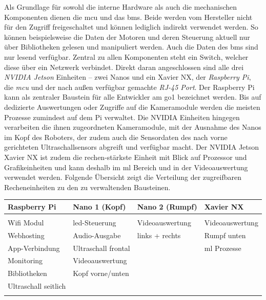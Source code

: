 Als Grundlage für sowohl die interne Hardware als auch die mechanischen Komponenten dienen die \gls{mcu} und das \gls{bms}.
Beide werden vom Hersteller nicht für den Zugriff freigeschaltet und können lediglich indirekt verwendet werden.
So können beispielsweise die Daten der Motoren und deren Steuerung aktuell nur über Bibliotheken gelesen und manipuliert werden.
Auch die Daten des \gls{bms} sind nur lesend verfügbar.
Zentral zu allen Komponenten steht ein Switch, welcher diese über ein Netzwerk verbindet.
Direkt daran angeschlossen sind alle drei \emph{NVIDIA Jetson} Einheiten -- zwei Nanos und ein Xavier NX, der \emph{Raspberry Pi},
die \emph{\gls{mcu}} und der nach außen verfügbar gemachte \emph{RJ-45 Port}.
Der Raspberry Pi kann als zentraler Baustein für alle Entwickler am \gls{go1} bezeichnet werden.
Bis auf dedizierte Auswertungen oder Zugriffe auf die Kameramodule werden die meisten Prozesse zumindest auf dem Pi verwaltet.
Die NVIDIA Einheiten hingegen verarbeiten die ihnen zugeordneten Kameramodule, mit der Ausnahme des Nanos im Kopf des Roboters,
der zudem auch die Sensordaten des nach vorne gerichteten Ultraschallsensors abgreift und verfügbar macht.
Der NVIDIA Jetson Xavier NX ist zudem die rechen-stärkste Einheit mit Blick auf Prozessor und Grafikeinheiten und kann
deshalb im \gls{ml} Bereich und in der Videoauswertung verwendet werden.
Folgende Übersicht zeigt die Verteilung der zugreifbaren Recheneinheiten zu den zu verwaltenden Bausteinen.
\newline

\begin{table}[h]
    \centering
    \begin{tabularx}{\textwidth}{X|X|X|X}
        \textbf{Raspberry Pi} & \textbf{Nano 1 (Kopf)} & \textbf{Nano 2 (Rumpf)} & \textbf{Xavier NX} \\ \hline
        &                        &                         &                    \\
        Wifi Modul            & \gls{led}-Steuerung    & Videoauswertung         & Videoauswertung    \\
        Webhosting            & Audio-Ausgabe          & links + rechts          & Rumpf unten        \\
        App-Verbindung        & Ultraschall frontal    &                         & \gls{ml} Prozesse  \\
        Monitoring            & Videoauswertung        &                         &                    \\
        Bibliotheken          & Kopf vorne/unten       &                         &                    \\
        Ultraschall seitlich  &                        &                         &                    \\
        &                        &                         &
    \end{tabularx}
    \label{tab:ueberblick_hardware_funktionen}
\end{table}

